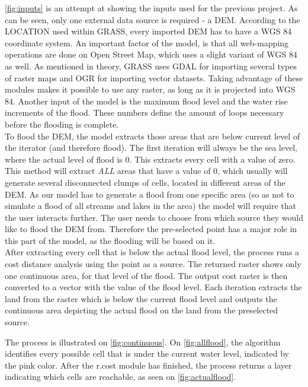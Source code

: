 \autoref{fig:inputs} is an attempt at showing the inputs used for the previous project. As can be seen, only one external data source is required - a DEM. According to the LOCATION used within GRASS, every imported DEM has to have a WGS 84 coordinate system. An important factor of the model, is that all web-mapping operations are done on Open Street Map, which uses a slight variant of WGS 84 as well. As mentioned in theory, GRASS uses GDAL for importing several types of raster maps and OGR for importing vector datasets. Taking advantage of these modules makes it possible to use any raster, as long as it is projected into WGS 84. Another input of the model is the maximum flood level and the water rise increments of the flood. These numbers define the amount of loops necessary before the flooding is complete.\\
To flood the DEM, the model extracts those areas that are below current level of the iterator (and therefore flood). The first iteration will always be the sea level, where the actual level of flood is 0. This extracts every cell with a value of zero.  \\
This method will extract \emph{ALL} areas that have a value of 0, which usually will generate several disconnected clumps of cells, located in different areas of the DEM. As our model has to generate a flood from one specific area (so as not to simulate a flood of all streams and lakes in the area) the model will require that the user interacts further. The user needs to choose from which source they would like to flood the DEM from. Therefore the pre-selected point has a major role in this part of the model, as the flooding will be based on it. \\
After extracting every cell that is below the actual flood level, the process runs a cost distance analysis using the point as a source. The returned raster shows only one continuous area, for that level of the flood. The output cost raster is then converted to a vector with the value of the flood level. Each iteration extracts the land from the raster which is below the current flood level and outputs the continuous area depicting the actual flood on the land from the preselected source. 

The process is illustrated on \autoref{fig:continuous}. On \autoref{fig:allflood}, the algorithm identifies every possible cell that is under the current water level, indicated by the pink color. After the r.cost module has finished, the process returns a layer indicating which cells are reachable, as seen on \autoref{fig:actualflood}.\\

